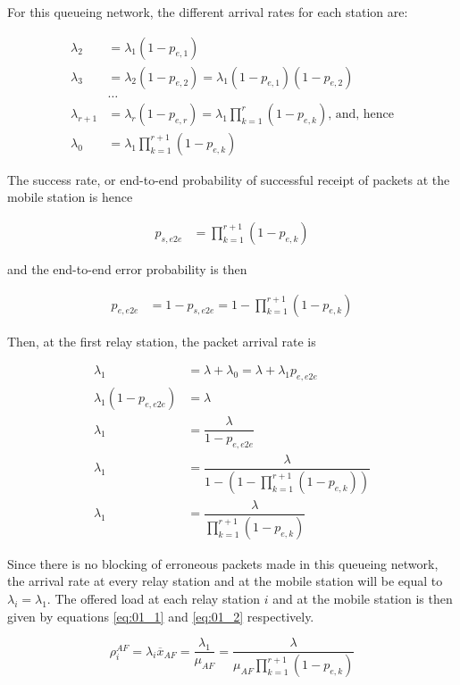For this queueing network, the different arrival rates for each station are:

\begin{align*}
  \lambda_2 &= \lambda_1 (1 - p_{e,1}) \\
  \lambda_3 &= \lambda_2 (1 - p_{e,2}) = \lambda_1 (1 - p_{e,1}) (1 - p_{e,2}) \\
  & \dots \\
  \lambda_{r+1} &= \lambda_r (1-p_{e,r}) = \lambda_1 \prod_{k=1}^{r} (1 - p_{e,k})
  \text{, and, hence} \\
  \lambda_0 &= \lambda_1 \prod_{k=1}^{r+1} (1 - p_{e,k})
\end{align*}

The success rate, or end-to-end probability of successful receipt of packets at
the mobile station is hence

\begin{align*}
  p_{s,e2e} &= \prod_{k=1}^{r+1} (1 - p_{e,k})
\end{align*}

and the end-to-end error probability is then

\begin{align*}
  p_{e,e2e} &= 1 - p_{s,e2e} = 1 - \prod_{k=1}^{r+1} (1 - p_{e,k})
\end{align*}



Then, at the first relay station, the packet arrival rate is

\begin{align*}
  \lambda_1 &= \lambda + \lambda_0 = \lambda + \lambda_1 p_{e,e2e} \\
  \lambda_1 (1-p_{e,e2e}) &= \lambda  \\
  \lambda_1 &= \dfrac{\lambda}{1-p_{e,e2e}} \\
  \lambda_1 &= \dfrac{\lambda}{1 - (1 - \prod\limits_{k=1}^{r+1} (1 - p_{e,k}))} \\
  \lambda_1 &= \dfrac{\lambda}{\prod\limits_{k=1}^{r+1} (1 - p_{e,k})}
\end{align*}

Since there is no blocking of erroneous packets made in this queueing network,
the arrival rate at every relay station and at the mobile station will be equal
to $\lambda_i = \lambda_1$. The offered load at each relay station $i$ and at
the mobile station is then given by equations \ref{eq:01_1} and \ref{eq:01_2}
respectively.

\begin{equation}
  \rho_i^{AF} = \lambda_i \overline{x}_{AF} = \dfrac{\lambda_1}{\mu_{AF}} = \dfrac{\lambda}{\mu_{AF}\prod\limits_{k=1}^{r+1} (1 - p_{e,k})}
  \label{eq:01_1}
\end{equation}

